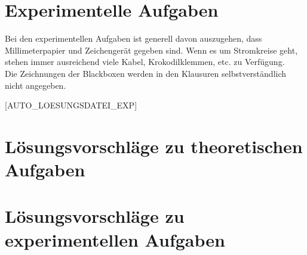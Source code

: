 \section*{Experimentelle Aufgaben}

Bei den experimentellen Aufgaben ist generell davon auszugehen, dass Millimeterpapier und Zeichengerät gegeben sind. Wenn es um Stromkreise geht, stehen immer ausreichend viele Kabel, Krokodilklemmen, etc. zu Verfügung.\\
Die Zeichnungen der Blackboxen werden in den Klausuren selbstverständlich nicht angegeben.

\setcounter{numlabel}{0}
[AUTO_LOESUNGSDATEI_EXP]






\section*{Lösungsvorschläge zu theoretischen Aufgaben}


\section*{Lösungsvorschläge zu experimentellen Aufgaben}



\endinput

